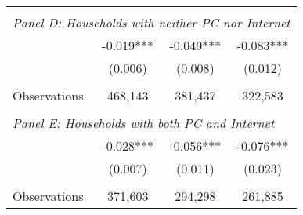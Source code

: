 {\begin{tabular}{lccc}
&  &  &   \\
\multicolumn{4}{l}{\textit{Panel D: Households with neither PC nor Internet}} \\
\hspace{3mm}        &      -0.019***&      -0.049***&      -0.083***\\
                    &     (0.006)   &     (0.008)   &     (0.012)   \\
                    &               &               &               \\
\hspace{3mm}Observations&     468,143   &     381,437   &     322,583   \\
 
&  &  &   \\
\multicolumn{4}{l}{\textit{Panel E: Households with both PC and Internet}} \\
\hspace{3mm}        &      -0.028***&      -0.056***&      -0.076***\\
                    &     (0.007)   &     (0.011)   &     (0.023)   \\
                    &               &               &               \\
\hspace{3mm}Observations&     371,603   &     294,298   &     261,885   \\
 

\bottomrule
\end{tabular}
}
